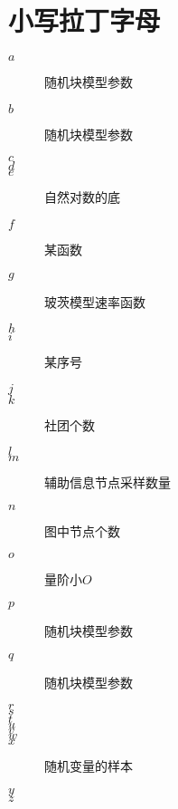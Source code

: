 \documentclass{ctexart}
\begin{document}
\section{小写拉丁字母}
\begin{description}
    \item[$a$] 随机块模型参数
    \item[$b$] 随机块模型参数
    \item[$c$] 
    \item[$d$] 
    \item[$e$] 自然对数的底
    \item[$f$] 某函数
    \item[$g$] 玻茨模型速率函数
    \item[$h$] 
    \item[$i$] 某序号
    \item[$j$] 
    \item[$k$] 社团个数
    \item[$l$] 
    \item[$m$] 辅助信息节点采样数量
    \item[$n$] 图中节点个数
    \item[$o$] 量阶小$O$
    \item[$p$] 随机块模型参数
    \item[$q$] 随机块模型参数
    \item[$r$] 
    \item[$s$] 
    \item[$t$] 
    \item[$u$] 
    \item[$v$] 
    \item[$w$] 
    \item[$x$] 随机变量的样本
    \item[$y$] 
    \item[$z$] 
\end{description}
\end{document}
